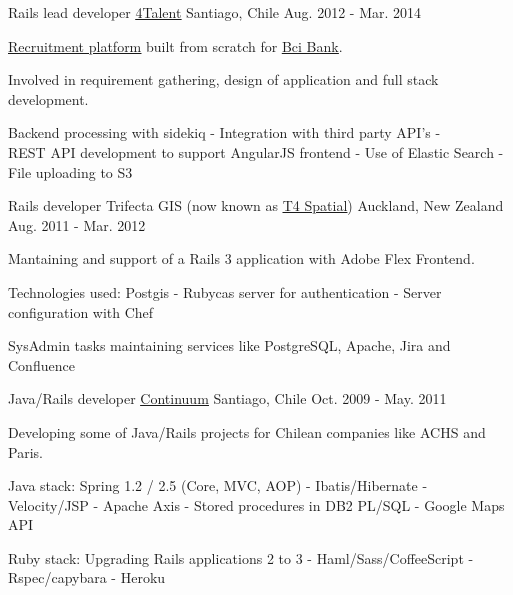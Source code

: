 \begin{cventries}
  \cventry
    {Rails lead developer} %
    {\href{http://4talent.cl/}{\underline{4Talent}}} %
    {Santiago, Chile} %
    {Aug. 2012 - Mar. 2014} %
    {
      \begin{cvitems} %
        \item { \href{http://trabajaenbci.cl/}{\underline{Recruitment platform}}
                built from scratch for \href{https://www.bci.cl/}{\underline{Bci Bank}}.}
        \item { Involved in requirement gathering, design of application and full stack development.}
        \item { Backend processing with sidekiq - Integration with third party API's -\\
                REST API development to support AngularJS frontend -
                Use of Elastic Search - File uploading to S3}
      \end{cvitems}
    }

  \cventry
    {Rails developer} %
    {Trifecta GIS (now known as {\href{http://www.t4spatial.com/}{\underline{T4 Spatial}}})} %
    {Auckland, New Zealand} %
    {Aug. 2011 - Mar. 2012} %
    {
      \begin{cvitems} %
        \item { Mantaining and support of a Rails 3 application with Adobe Flex Frontend.}
        \item { Technologies used: Postgis - Rubycas server for authentication - Server configuration with Chef }
        \item { SysAdmin tasks maintaining services like PostgreSQL, Apache, Jira and Confluence}
      \end{cvitems}
    }

  \cventry
    {Java/Rails developer} %
    {\href{http://www.continuumhq.co/}{\underline{Continuum}}} %
    {Santiago, Chile} %
    {Oct. 2009 - May. 2011} %
    {
      \begin{cvitems} %
        \item { Developing some of Java/Rails projects for Chilean companies like ACHS and Paris.}
        \item { Java stack: Spring 1.2 / 2.5 (Core, MVC, AOP) - Ibatis/Hibernate -
                Velocity/JSP - Apache Axis - Stored procedures in DB2 PL/SQL - Google Maps API}
        \item { Ruby stack: Upgrading Rails applications 2 to 3 - Haml/Sass/CoffeeScript - Rspec/capybara - Heroku }
      \end{cvitems}
    }


\end{cventries}
